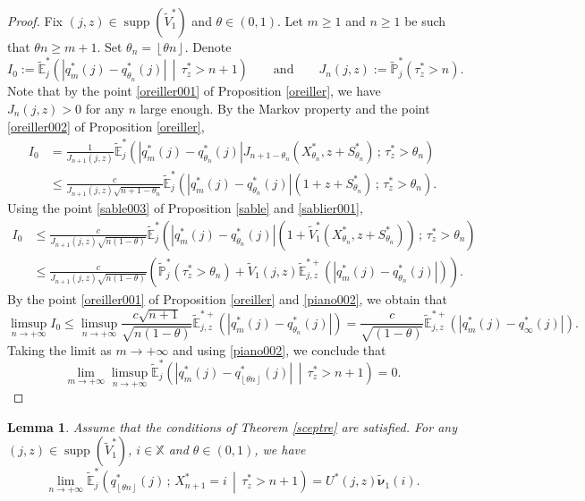 \documentclass[12pt]{amsart}
\newtheorem{lemma}[theorem]{Lemma}
\theoremstyle{definition}
\numberwithin{equation}{section}
\newcommand*{\abs}[1]{\left\lvert#1\right\rvert}
\newcommand*{\pent}[1]{\left\lfloor#1\right\rfloor}
\newcommand*{\sachant}[2]{\left.#1 \,\middle|\,#2\right.}
\def\bb#1{\mathbb{#1}}
\def\tt#1{\tilde{#1}}
\def\tbs#1{\tilde{\boldsymbol{#1}}}
\def\tbb#1{\tilde{\mathbb{#1}}}
\def\geq{\geqslant}
\def\leq{\leqslant}
\DeclareMathOperator{\supp}{supp}
\begin{document}
\begin{proof}
Fix $(j,z) \in \supp(\tt V_1^*)$ and $\theta \in (0,1)$. 
Let $m \geq 1$ and $n \geq 1$ be such that $\theta n \geq m+1$.  Set $\theta_n = \pent{\theta n}$. Denote 
\[
I_0 := \tbb E_j^* \left( \sachant{ \abs{q_m^*(j)-q_{\theta_n}^*(j)} }{ \tau_z^* > n+1 } \right) \qquad \text{and} \qquad J_n(j,z) := \tbb P_j^* \left( \tau_z^* > n \right).
\]
Note that by the point \ref{oreiller001} of Proposition \ref{oreiller}, we have $J_n(j,z) > 0$ for any $n$ large enough. 
By the Markov property and  the point \ref{oreiller002} of Proposition \ref{oreiller},
\begin{align*}
I_0 &= \frac{1}{J_{n+1}(j,z)} \tbb E_j^* \left( \abs{q_m^*(j)-q_{\theta_n}^*(j)} J_{n+1-\theta_n} \left( X_{\theta_n}^*,z+S_{\theta_n}^* \right) \,;\, \tau_z^* > \theta_n  \right) \\
&\leq \frac{c}{J_{n+1}(j,z) \sqrt{n+1-\theta_n}} \tbb E_j^* \left( \abs{q_m^*(j)-q_{\theta_n}^*(j)} \left( 1+z+S_{\theta_n}^* \right) \,;\, \tau_z^* > \theta_n  \right).
\end{align*}
Using the point \ref{sable003} of Proposition \ref{sable} and \eqref{sablier001},
\begin{align*}
I_0 &\leq \frac{c}{J_{n+1}(j,z) \sqrt{n(1-\theta)}} \tbb E_j^* \left( \abs{q_m^*(j)-q_{\theta_n}^*(j)} \left( 1+\tt V_1^*\left( X_{\theta_n}^*,z+S_{\theta_n}^* \right) \right) \,;\, \tau_z^* > \theta_n  \right) \\
&\leq \frac{c}{J_{n+1}(j,z) \sqrt{n(1-\theta)}} \left( \tbb P_j^* \left( \tau_z^* > \theta_n \right) + \tt V_1(j,z) \tbb E_{j,z}^{*+} \left( \abs{q_m^*(j)-q_{\theta_n}^*(j)} \right) \right).
\end{align*}
By the point \ref{oreiller001} of Proposition \ref{oreiller} and \eqref{piano002}, we obtain that
\[
\limsup_{n\to+\infty} I_0 \leq \limsup_{n\to+\infty} \frac{c\sqrt{n+1}}{\sqrt{n(1-\theta)}}  \tbb E_{j,z}^{*+} \left( \abs{q_m^*(j)-q_{\theta_n}^*(j)} \right) = \frac{c}{\sqrt{(1-\theta)}}  \tbb E_{j,z}^{*+} \left( \abs{q_m^*(j)-q_{\infty}^*(j)} \right).
\]
Taking the limit as $m \to +\infty$ and using \eqref{piano002}, we conclude that 
\[
\lim_{m\to+\infty} \limsup_{n\to +\infty} \tbb E_j^* \left( \sachant{ \abs{q_m^*(j)-q_{\pent{\theta n}}^*(j)} }{ \tau_z^* > n+1 } \right) = 0.
\]
\end{proof}

\begin{lemma} Assume that the conditions of Theorem \ref{sceptre} are satisfied.
\label{panier}
For any $(j,z) \in \supp(\tt V_1^*)$, $i \in \bb X$ and $\theta \in (0,1)$, we have
\[
\lim_{n\to +\infty} \tbb E_j^* \left( \sachant{ q_{\pent{\theta n}}^*(j) \,;\, X_{n+1}^* = i }{ \tau_z^* > n+1 } \right) = U^*(j,z) \tbs \nu_1 (i).
\]
\end{lemma}
\end{document}
